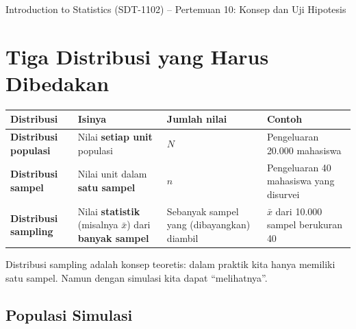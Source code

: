 \documentclass[
  indonesian,
  letterpaper,
]{book}
\newcounter{none} %
\begin{document}
Introduction to Statistics (SDT-1102) -- Pertemuan 10: Konsep dan Uji
Hipotesis

\hfill\break


\chapter{Tiga Distribusi yang Harus
Dibedakan}\label{tiga-distribusi-yang-harus-dibedakan}

{\def\LTcaptype{none} %
\begin{longtable}[]{@{}
  >{\raggedright\arraybackslash}p{}
  >{\raggedright\arraybackslash}p{}
  >{\raggedright\arraybackslash}p{}
  >{\raggedright\arraybackslash}p{}@{}}
\toprule\noalign{}
\begin{minipage}[b]{\linewidth}\raggedright
Distribusi
\end{minipage} & \begin{minipage}[b]{\linewidth}\raggedright
Isinya
\end{minipage} & \begin{minipage}[b]{\linewidth}\raggedright
Jumlah nilai
\end{minipage} & \begin{minipage}[b]{\linewidth}\raggedright
Contoh
\end{minipage} \\
\midrule\noalign{}
\endhead
\bottomrule\noalign{}
\endlastfoot
\textbf{Distribusi populasi} & Nilai \textbf{setiap unit} populasi &
\(N\) & Pengeluaran 20.000 mahasiswa \\
\textbf{Distribusi sampel} & Nilai unit dalam \textbf{satu sampel} &
\(n\) & Pengeluaran 40 mahasiswa yang disurvei \\
\textbf{Distribusi sampling} & Nilai \textbf{statistik} (misalnya
\(\bar{x}\)) dari \textbf{banyak sampel} & Sebanyak sampel yang
(dibayangkan) diambil & \(\bar{x}\) dari 10.000 sampel berukuran 40 \\
\end{longtable}
}

Distribusi sampling adalah konsep teoretis: dalam praktik kita hanya
memiliki satu sampel. Namun dengan simulasi kita dapat ``melihatnya''.

\section{Populasi Simulasi}\label{populasi-simulasi}
\end{document}

